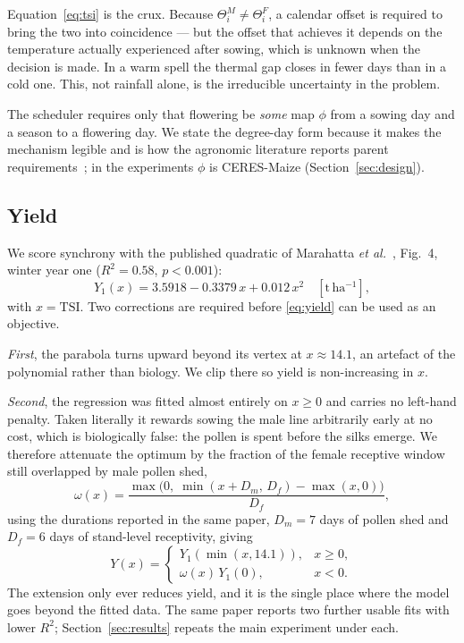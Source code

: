 \documentclass[10pt,twocolumn]{article}
\newcommand{\TSI}{\mathrm{TSI}}
\begin{document}
Equation~\eqref{eq:tsi} is the crux. Because $\Theta^M_i \ne \Theta^F_i$, a
calendar offset is required to bring the two into coincidence --- but the
offset that achieves it depends on the temperature actually experienced after
sowing, which is unknown when the decision is made. In a warm spell the
thermal gap closes in fewer days than in a cold one. This, not rainfall
alone, is the irreducible uncertainty in the problem.

The scheduler requires only that flowering be \emph{some} map $\phi$ from a
sowing day and a season to a flowering day. We state the degree-day form
because it makes the mechanism legible and is how the agronomic literature
reports parent requirements~\cite{marahatta2025,chassaigne2021}; in the
experiments $\phi$ is CERES-Maize (Section~\ref{sec:design}).

\subsection{Yield}

We score synchrony with the published quadratic of Marahatta
\textit{et al.}~\cite{marahatta2025}, Fig.~4, winter year one
($R^2 = 0.58$, $p < 0.001$):
\begin{equation}
Y_1(x) = 3.5918 - 0.3379\,x + 0.012\,x^2 \quad [\mathrm{t\,ha^{-1}}],
\label{eq:yield}
\end{equation}
with $x = \TSI$. Two corrections are required before
\eqref{eq:yield} can be used as an objective.

\emph{First}, the parabola turns upward beyond its vertex at $x \approx 14.1$,
an artefact of the polynomial rather than biology. We clip there so yield is
non-increasing in $x$.

\emph{Second}, the regression was fitted almost entirely on $x \ge 0$ and
carries no left-hand penalty. Taken literally it rewards sowing the male
line arbitrarily early at no cost, which is biologically false: the pollen
is spent before the silks emerge. We therefore attenuate the optimum by the
fraction of the female receptive window still overlapped by male pollen
shed,
\begin{equation}
\omega(x) = \frac{\max\!\big(0,\; \min(x + D_m,\, D_f) - \max(x,0)\big)}{D_f},
\end{equation}
using the durations reported in the same paper, $D_m = 7$ days of pollen shed
and $D_f = 6$ days of stand-level receptivity, giving
\begin{equation}
Y(x) =
\begin{cases}
Y_1(\min(x,14.1)), & x \ge 0,\\[2pt]
\omega(x)\,Y_1(0), & x < 0.
\end{cases}
\label{eq:Y}
\end{equation}
The extension only ever reduces yield, and it is the single place where the
model goes beyond the fitted data. The same paper reports two further
usable fits with lower $R^2$; Section~\ref{sec:results} repeats the main
experiment under each.
\end{document}
